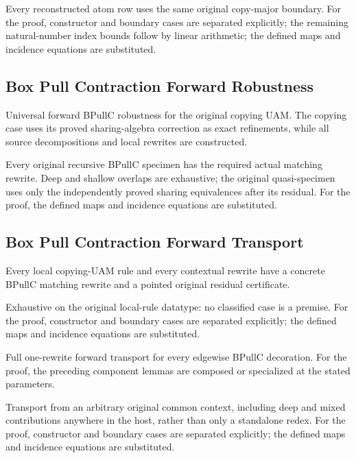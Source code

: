 Every reconstructed atom row uses the same original copy-major boundary.
For the proof, constructor and boundary cases are separated explicitly; the remaining natural-number index bounds follow by linear arithmetic; the defined maps and incidence equations are substituted.
\par{}

\subsection{Box Pull Contraction Forward Robustness}
Universal forward BPullC robustness for the original copying UAM. The copying case uses its proved sharing-algebra correction as exact refinements, while all source decompositions and local rewrites are constructed.

Every original recursive BPullC specimen has the required actual matching rewrite. Deep and shallow overlaps are exhaustive; the original quasi-specimen uses only the independently proved sharing equivalences after its residual.
For the proof, the defined maps and incidence equations are substituted.
\par{}

\subsection{Box Pull Contraction Forward Transport}
Every local copying-UAM rule and every contextual rewrite have a concrete BPullC matching rewrite and a pointed original residual certificate.

Exhaustive on the original local-rule datatype: no classified case is a premise.
For the proof, constructor and boundary cases are separated explicitly; the defined maps and incidence equations are substituted.
\par{}

Full one-rewrite forward transport for every edgewise BPullC decoration.
For the proof, the preceding component lemmas are composed or specialized at the stated parameters.
\par{}

Transport from an arbitrary original common context, including deep and mixed contributions anywhere in the host, rather than only a standalone redex.
For the proof, constructor and boundary cases are separated explicitly; the defined maps and incidence equations are substituted.
\par{}

